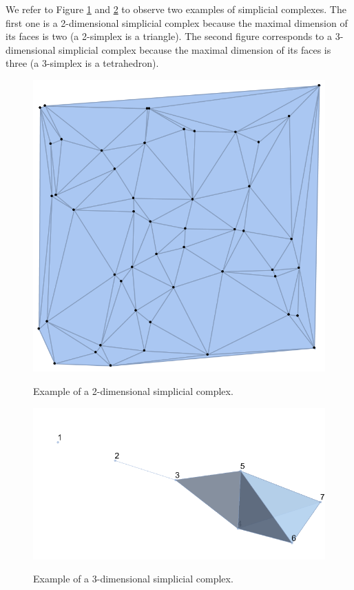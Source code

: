 \documentclass[
	fontsize=10pt, %
	twoside=false, %
	secnumdepth=1, %
]{kaobook}
\begin{document}
We refer to Figure \ref{C2:Fig:Delunay} and \ref{C2:Fig:SimplicialComplex} to observe two examples of simplicial complexes. The first one is a 2-dimensional simplicial complex because the maximal dimension of its faces is two (a 2-simplex is a triangle). The second figure corresponds to a 3-dimensional simplicial complex because the maximal dimension of its faces is three (a 3-simplex is a tetrahedron).
\begin{figure}[h]
\includegraphics[scale=0.5]{Delunay_Mesh.png}
\label{C2:Fig:Delunay}
\caption{Example of a 2-dimensional simplicial complex.}
\end{figure}

\begin{figure}[h]
\includegraphics[scale=0.5]{Simplicial_Complex.png}
\label{C2:Fig:SimplicialComplex}
\caption{Example of a 3-dimensional simplicial complex.}
\end{figure}
\end{document}
